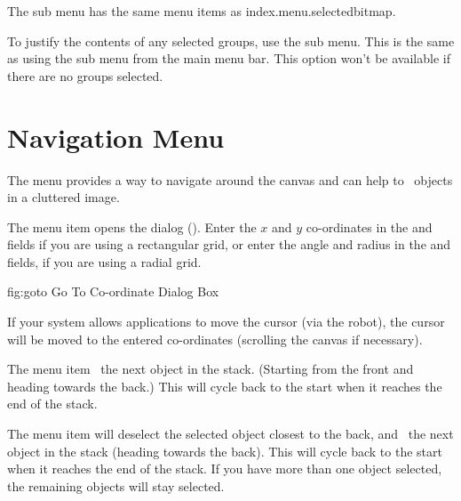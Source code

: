
The  sub menu has the same
menu items as \gls{index.menu.selectedbitmap}.


To justify the contents of any selected \glspl{group}, use the
 sub menu. This is the same as using the
 sub menu from the main menu bar.
This option won't be available if there are no
\glspl{group} selected.


\section{Navigation Menu}\label{sec:navigate}


The  menu provides a way to navigate around the
\gls{canvas} and can help to \select\ \glspl{object}
in a cluttered image.


The  menu item opens the
 dialog ().  Enter the
$x$ and $y$ co-ordinates in the  and
 fields if you are using a rectangular grid,
or enter the angle and radius in the  and
 fields, if you are using a radial grid.

\FloatFig
  {fig:goto}
  {}
  {Go To Co-ordinate Dialog Box}

If your system allows applications to move the cursor
(via the \gls{robot}), the cursor will be moved to the entered
co-ordinates (scrolling the \gls{canvas} if necessary).


The  menu item 
\selects\ the next \gls{object} in the \gls{stack}. (Starting from the
\gls{front} and heading towards the \gls{back}.) This will cycle back to
the start when it reaches the end of the \gls{stack}.


The  menu item will deselect the
selected \gls{object} closest to the \gls{back}, and \select\
the next \gls{object} in the \gls{stack} (heading towards the \gls{back}). This
will cycle back to the start when it reaches the end of the stack.
If you have more than one \gls{object} selected, the remaining
\glspl*{object} will stay selected.

